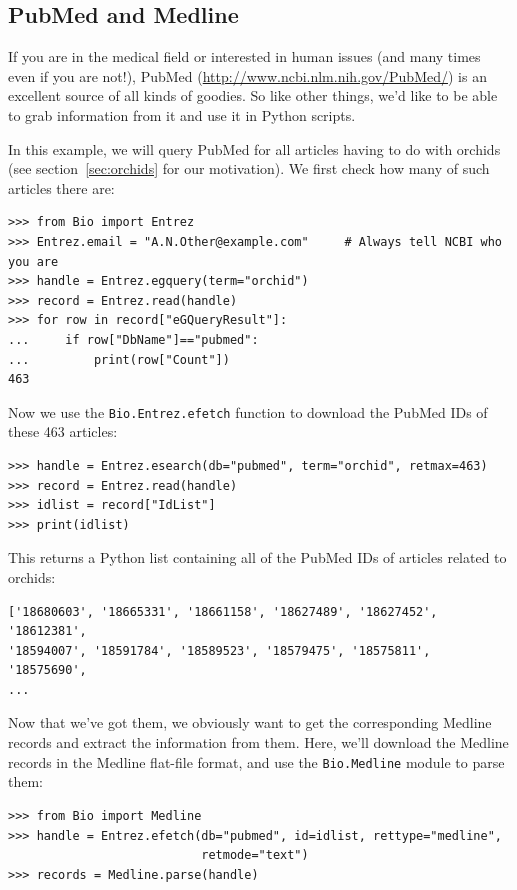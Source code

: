 \documentclass{report}
\begin{document}
\subsection{PubMed and Medline}
\label{subsec:pub_med}

If you are in the medical field or interested in human issues (and many times even if you are not!), PubMed (\url{http://www.ncbi.nlm.nih.gov/PubMed/}) is an excellent source of all kinds of goodies. So like other things, we'd like to be able to grab information from it and use it in Python scripts.

In this example, we will query PubMed for all articles having to do with orchids (see section~\ref{sec:orchids} for our motivation). We first check how many of such articles there are:

\begin{verbatim}
>>> from Bio import Entrez
>>> Entrez.email = "A.N.Other@example.com"     # Always tell NCBI who you are
>>> handle = Entrez.egquery(term="orchid")
>>> record = Entrez.read(handle)
>>> for row in record["eGQueryResult"]:
...     if row["DbName"]=="pubmed":
...         print(row["Count"])
463
\end{verbatim}

Now we use the \verb+Bio.Entrez.efetch+ function to download the PubMed IDs of these 463 articles:
\begin{verbatim}
>>> handle = Entrez.esearch(db="pubmed", term="orchid", retmax=463)
>>> record = Entrez.read(handle)
>>> idlist = record["IdList"]
>>> print(idlist)
\end{verbatim}


This returns a Python list containing all of the PubMed IDs of articles related to orchids:
\begin{verbatim}
['18680603', '18665331', '18661158', '18627489', '18627452', '18612381',
'18594007', '18591784', '18589523', '18579475', '18575811', '18575690',
...
\end{verbatim}

Now that we've got them, we obviously want to get the corresponding Medline records and extract the information from them. Here, we'll download the Medline records in the Medline flat-file format, and use the \verb+Bio.Medline+ module to parse them:
\begin{verbatim}
>>> from Bio import Medline
>>> handle = Entrez.efetch(db="pubmed", id=idlist, rettype="medline",
                           retmode="text")
>>> records = Medline.parse(handle)
\end{verbatim}
\end{document}
